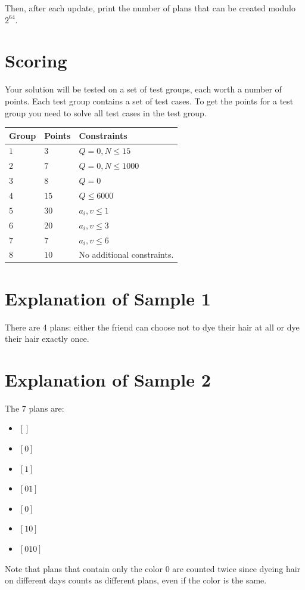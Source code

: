 Then, after each update, print the number of plans that can be created modulo $2^{64}$.

\section*{Scoring}
Your solution will be tested on a set of test groups, each worth a number of points. Each test group contains
a set of test cases. To get the points for a test group you need to solve all test cases in the test group.

\noindent
\begin{tabular}{| l | l | p{12cm} |}
  \hline
  \textbf{Group} & \textbf{Points} & \textbf{Constraints} \\ \hline
  $1$    & $3$        & $Q=0, N \leq 15$ \\ \hline
  $2$    & $7$        & $Q=0, N \leq 1000$ \\ \hline
  $3$    & $8$        & $Q=0$ \\ \hline
  $4$    & $15$       & $Q \leq 6000$ \\ \hline
  $5$    & $30$       & $a_i, v \leq 1$ \\ \hline
  $6$    & $20$       & $a_i, v \leq 3$ \\ \hline
  $7$    & $7$        & $a_i, v \leq 6$ \\ \hline
  $8$    & $10$       & No additional constraints. \\ \hline
\end{tabular}


\section*{Explanation of Sample 1}
There are 4 plans: either the friend can choose not to dye their hair at all or dye their hair exactly once.

\section*{Explanation of Sample 2}
The 7 plans are:
\begin{itemize}
  \item $[]$
  \item $[0]$
  \item $[1]$
  \item $[0 1]$
  \item $[0]$
  \item $[1 0]$
  \item $[0 1 0]$
\end{itemize}
Note that plans that contain only the color $0$ are counted twice since dyeing hair on different days counts
as different plans, even if the color is the same.

